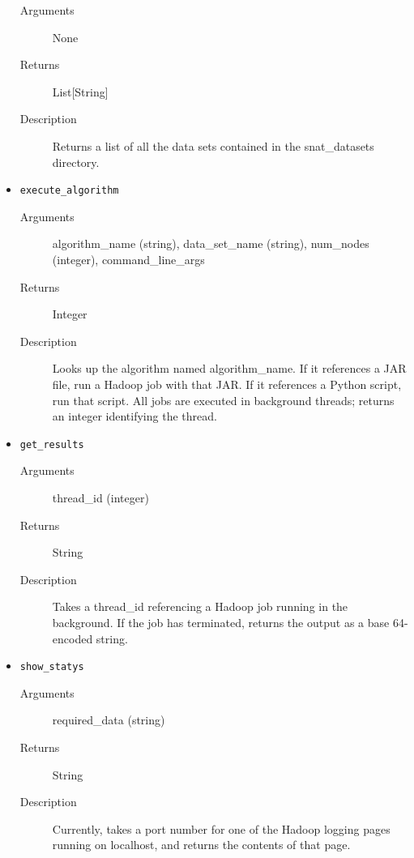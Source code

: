 \begin{itemize}
    \begin{description}        
        \item[Arguments] None
        
        \item[Returns] List[String]
        
        \item[Description] Returns a list of all the data sets contained in the
snat\_datasets directory.
    \end{description}
    
    \item {\tt execute\_algorithm}

    \begin{description}        
        \item[Arguments] algorithm\_name (string), data\_set\_name (string),
num\_nodes (integer), command\_line\_args
        
        \item[Returns] Integer
        
        \item[Description] Looks up the algorithm named algorithm\_name. If it
references a JAR file, run a Hadoop job with that JAR. If it references a Python
script, run that script. All jobs are executed in background threads; returns an
integer identifying the thread.
    \end{description}
    
    \item {\tt get\_results}

    \begin{description}        
        \item[Arguments] thread\_id (integer)
        
        \item[Returns] String
        
        \item[Description] Takes a thread\_id referencing a Hadoop job running
in the background. If the job has terminated, returns the output as a base
64-encoded string.
    \end{description}
    
    \item {\tt show\_statys}

    \begin{description}        
        \item[Arguments] required\_data (string)
        
        \item[Returns] String
        
        \item[Description] Currently, takes a port number for one of the Hadoop
logging pages running on localhost, and returns the contents of that page.
    \end{description}
\end{itemize}

